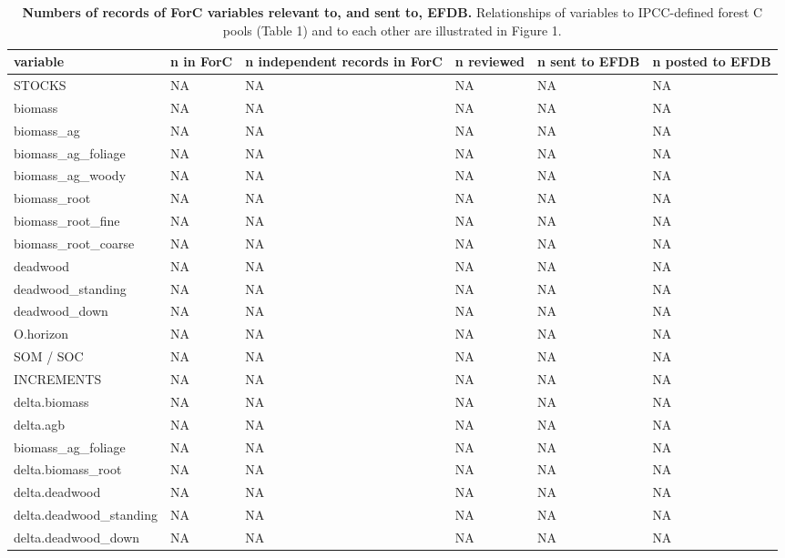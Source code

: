 \documentclass[, manuscript]{copernicus}
\begin{document}
\begin{table}

\caption{\label{tab:table_variables}\textbf{Numbers of records of ForC variables relevant to, and sent to, EFDB.} Relationships of variables to IPCC-defined forest C pools (Table 1) and to each other are illustrated in Figure 1. }
\centering
\begin{tabu} to 
\hline
\textbf{variable} & \textbf{n in ForC} & \textbf{n independent records in ForC} & \textbf{n reviewed} & \textbf{n sent to EFDB} & \textbf{n posted to EFDB}\\
\hline
STOCKS & NA & NA & NA & NA & NA\\
\hline
biomass & NA & NA & NA & NA & NA\\
\hline
biomass\_ag & NA & NA & NA & NA & NA\\
\hline
biomass\_ag\_foliage & NA & NA & NA & NA & \vphantom{1} NA\\
\hline
biomass\_ag\_woody & NA & NA & NA & NA & NA\\
\hline
biomass\_root & NA & NA & NA & NA & NA\\
\hline
biomass\_root\_fine & NA & NA & NA & NA & NA\\
\hline
biomass\_root\_coarse & NA & NA & NA & NA & NA\\
\hline
deadwood & NA & NA & NA & NA & NA\\
\hline
deadwood\_standing & NA & NA & NA & NA & NA\\
\hline
deadwood\_down & NA & NA & NA & NA & NA\\
\hline
O.horizon & NA & NA & NA & NA & NA\\
\hline
SOM / SOC & NA & NA & NA & NA & NA\\
\hline
INCREMENTS & NA & NA & NA & NA & NA\\
\hline
delta.biomass & NA & NA & NA & NA & NA\\
\hline
delta.agb & NA & NA & NA & NA & NA\\
\hline
biomass\_ag\_foliage & NA & NA & NA & NA & NA\\
\hline
delta.biomass\_root & NA & NA & NA & NA & NA\\
\hline
delta.deadwood & NA & NA & NA & NA & NA\\
\hline
delta.deadwood\_standing & NA & NA & NA & NA & NA\\
\hline
delta.deadwood\_down & NA & NA & NA & NA & NA\\
\hline

\end{tabu}
\end{table}
\end{document}

